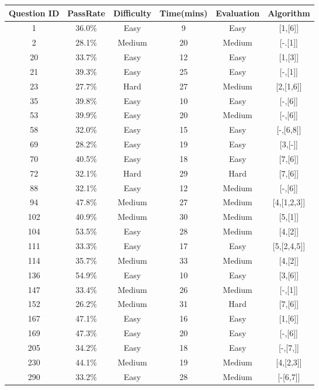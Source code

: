 \documentclass[10pt,twocolumn]{IEEEtran}
\begin{document}
\begin{table}[t]
\begin{tabular}{|c| c| c| c| c| c|} \hline
 Question ID & PassRate & Difficulty & Time(mins) &Evaluation &Algorithm \\
	 \hline
 	1 & 36.0\% & Easy & 9 & Easy & [1,[6]]\\ 
 	\hline
	 2 & 28.1\% & Medium & 20 &Medium& [-.[1]]\\
 	\hline
	 20 & 33.7\% & Easy & 12&Easy& [1,[3]] \\
 	\hline
 	21 & 39.3\% & Easy & 25&Easy& [-,[1]] \\
 	\hline
 	23 & 27.7\% & Hard & 27&Medium&[2,[1,6]] \\
  	\hline
 	35 &39.8\%  & Easy & 10 &Easy&[-,[6]]\\
  	\hline
 	53 &39.9\%  & Easy & 20 &Medium& [-,[6]]\\
  	\hline
 	58 & 32.0\% & Easy & 15 &Easy&[-,[6,8]]\\
  	\hline
 	69 & 28.2\% & Easy & 19 &Easy&[3,[-]]\\
  	\hline
 	70 & 40.5\% & Easy & 18 &Easy&[7,[6]]\\
 	\hline
 	72 & 32.1\% & Hard & 29 &Hard&[7,[6]]\\
  	\hline
 	88 & 32.1\% & Easy & 12 &Medium&[-,[6]]\\
  	\hline
 	94 & 47.8\% & Medium & 27 & Medium&[4,[1,2,3]]\\
  	\hline
 	102 & 40.9\% & Medium & 30  &Medium & [5,[1]]\\
  	\hline
	104 & 53.5\% &Easy  &28  &Medium& [4,[2]]\\
  	\hline
 	111 &  33.3\%& Easy&17  &Easy& [5,[2,4,5]]\\
  	\hline
 	114 & 35.7\% &Medium  & 33  &Medium&[4,[2]]\\
  	\hline
 	136 &54.9\%  &Easy  &10  &Easy& [3,[6]]\\
  	\hline
 	147 & 33.4\% &Medium  &26  &Medium& [-,[1]]\\
	\hline
 	152 &  26.2\%& Medium & 31 &Hard&[7,[6]]\\
  	\hline
  	167 & 47.1\% &Easy  &16  &Easy&[1,[6]]\\
  	\hline
  	169 & 47.3\% &Easy  &20  &Easy&[-,[6]]\\
  	\hline
  	205 & 34.2\% &Easy  &18  &Easy& [-,[7,]]\\
  	\hline
  	230 & 44.1\% &Medium  &19  &Medium&[4,[2,3]]\\
  	\hline
 	290 & 33.2\% &Easy  &28  &Medium&[-[6,7]]\\

\end{tabular}
\end{table}
\end{document}
